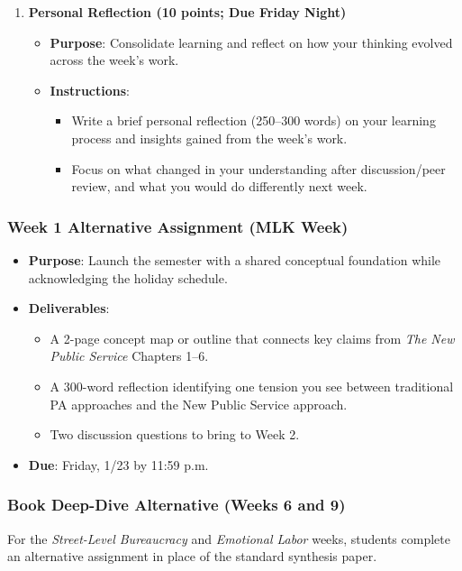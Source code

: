 \documentclass[11pt]{article}     %
\begin{document}
\begin{enumerate}
    \item \textbf{Personal Reflection (10 points; Due Friday Night)}
        \begin{itemize}
            \item \textbf{Purpose}: Consolidate learning and reflect on how your thinking evolved across the week's work.
            \item \textbf{Instructions}:
            \begin{itemize}
                \item Write a brief personal reflection (250--300 words) on your learning process and insights gained from the week's work.
                \item Focus on what changed in your understanding after discussion/peer review, and what you would do differently next week.
            \end{itemize}
        \end{itemize}
\end{enumerate}

\subsubsection*{Week 1 Alternative Assignment (MLK Week)}
\begin{itemize}
    \item \textbf{Purpose}: Launch the semester with a shared conceptual foundation while acknowledging the holiday schedule.
    \item \textbf{Deliverables}:
    \begin{itemize}
        \item A 2-page concept map or outline that connects key claims from \textit{The New Public Service} Chapters 1--6.
        \item A 300-word reflection identifying one tension you see between traditional PA approaches and the New Public Service approach.
        \item Two discussion questions to bring to Week 2.
    \end{itemize}
    \item \textbf{Due}: Friday, 1/23 by 11:59 p.m.
\end{itemize}

\subsubsection*{Book Deep-Dive Alternative (Weeks 6 and 9)}
For the \textit{Street-Level Bureaucracy} and \textit{Emotional Labor} weeks, students complete an alternative assignment in place of the standard synthesis paper.
\end{document}
